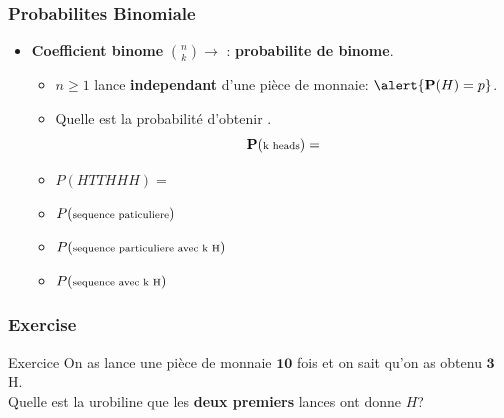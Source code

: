\documentclass{beamer}
\begin{document}
\begin{frame}[<+->]
  \frametitle{Probabilites Binomiale}
  
  \begin{itemize}
  \small
    \item \textbf{Coefficient binome} $\binom{n}{k}\longrightarrow$  :
    \alert{\textbf{probabilite de binome}}.\\[8pt]
    \begin{itemize}
      \item $n\geq 1$ lance \alert{\textbf{independant}}  d'une pièce de
      monnaie: $\alert{\mathbf{P}(H) = p}$.
      \item Quelle est la probabilité d'obtenir \textbf{}.
      $$
      \mathbf{P}(\text{\scriptsize k heads}) = 
      $$
\item $P(HTTHHH) = $\\[8pt]
\item $P(\text{\scriptsize sequence paticuliere})$ \\[8pt]
\item $P(\text{\scriptsize sequence particuliere avec k H})$\\[8pt]
\item $P(\text{\scriptsize sequence avec k H})$
    \end{itemize}
  \end{itemize}
\end{frame}

\begin{frame}[t]
  \frametitle{Exercise}
  \begin{block}{Exercice}
On as lance une pièce de monnaie   $\mathbf{10}$ fois et on sait qu'on
as obtenu $\mathbf{3}$ H.\\[4pt]

Quelle est la urobiline que les \alert{\textbf{deux premiers}}  lances ont donne
$H$?
\end{block}
\end{frame}
\end{document}
